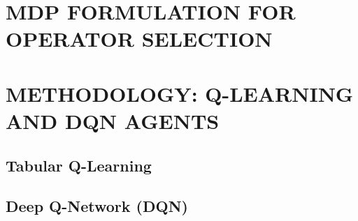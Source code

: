 \documentclass[final,11pt,times]{elsarticle}
\begin{document}

\section{MDP FORMULATION FOR OPERATOR SELECTION}
\label{sec:mdp}




\section{METHODOLOGY: Q-LEARNING AND DQN AGENTS}
\label{sec:agents}

\subsection{Tabular Q-Learning}



\subsection{Deep Q-Network (DQN)}
\end{document}
